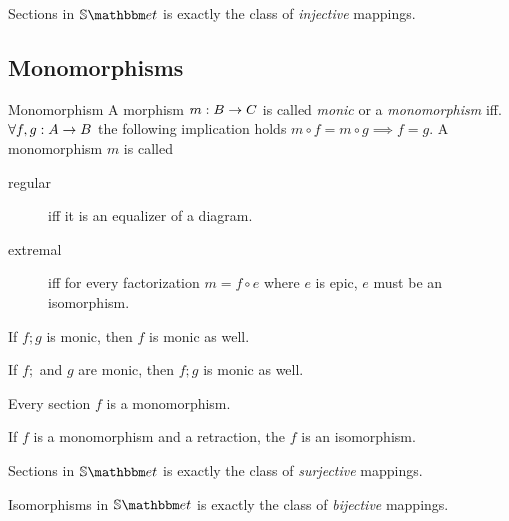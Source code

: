\begin{myfact}
Sections in $\catSET$ is exactly the class of \emph{injective} mappings.
\end{myfact}



\subsection{Monomorphisms}


\begin{mydef}{Monomorphism}
A morphism $\arrow{B}{m}{C}$ is called  \emph{monic} or a \emph{monomorphism} iff. $\forall \arrow{A}{f,g}{B}$ the following implication holds $m \circ f = m \circ g \implies f = g$.
A monomorphism $m$ is called
\begin{description}
\item[regular] iff it is an equalizer of a diagram.
\item[extremal] iff for every factorization $m = f \circ e$ where $e$ is epic, $e$ must be an isomorphism.
\end{description}
\end{mydef}

\begin{myprop}
	If $f;g$ is monic, then $f$ is monic as well.
\end{myprop}

\begin{myprop}
	If $f;$  and $g$ are monic, then $f;g$ is monic as well.
\end{myprop}

\begin{myprop}
Every section $f$ is a monomorphism.
\end{myprop}

\begin{myprop}
If $f$ is a monomorphism and a retraction, the $f$ is an isomorphism.
\end{myprop}

\begin{myfact}
	Sections in $\catSET$ is exactly the class of \emph{surjective} mappings.
\end{myfact}

\begin{myfact}
	Isomorphisms in $\catSET$ is exactly the class of \emph{bijective} mappings.
\end{myfact}


